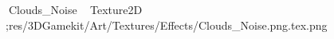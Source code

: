    Clouds_Noise             	   Texture2D
   ;   res/3DGamekit/Art/Textures/Effects/Clouds_Noise.png.tex.png